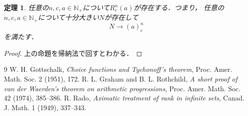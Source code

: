 \documentclass[leqno, 12pt]{jsarticle}
\newtheorem{thm}{定理}
\newcommand{\nn}{\mathbb{N}}
\begin{document}
\begin{thm}
任意の$n, c, a\in \nn_{+}$について$R_c^n(a)$が存在する．つまり，
任意の$n, c, a\in \nn_{+}$について十分大きい$N$が存在して
\[
N\to (a)_c^n
\]
を満たす．
\end{thm}
\begin{proof}
上の命題を帰納法で回すとわかる．
\end{proof}

\begin{thebibliography}{9}
W. H. Gottschalk, \textit{Choice functions and Tychonoff's theorem}, Proc. Amer. Math. Soc. 2 (1951), 172. 
R. L. Graham and B. L. Rothchild, \textit{A short proof of van der Waerden's theorem on arithmetic progressions}, Proc. Amer. Math. Soc. 42 (1974), 385--386. 
R. Rado, \textit{Aximatic treatment of rank in infinite sets}, Canad. J. Math. 1 (1949), 337--343. 
\end{thebibliography}




			
\end{document}
